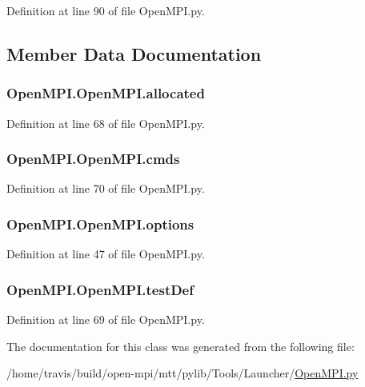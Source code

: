 Definition at line 90 of file Open\-M\-P\-I.\-py.



\subsection{Member Data Documentation}
\hypertarget{classOpenMPI_1_1OpenMPI_a9ffab4795264fde34d136269026204db}{
\subsubsection[{allocated}]{\setlength{\rightskip}{0pt plus 5cm}Open\-M\-P\-I.\-Open\-M\-P\-I.\-allocated}}\label{classOpenMPI_1_1OpenMPI_a9ffab4795264fde34d136269026204db}


Definition at line 68 of file Open\-M\-P\-I.\-py.

\hypertarget{classOpenMPI_1_1OpenMPI_a86be93bbc775c81263813274a8564efc}{
\subsubsection[{cmds}]{\setlength{\rightskip}{0pt plus 5cm}Open\-M\-P\-I.\-Open\-M\-P\-I.\-cmds}}\label{classOpenMPI_1_1OpenMPI_a86be93bbc775c81263813274a8564efc}


Definition at line 70 of file Open\-M\-P\-I.\-py.

\hypertarget{classOpenMPI_1_1OpenMPI_a4a263774614f0b83a63a26639b46b2f5}{
\subsubsection[{options}]{\setlength{\rightskip}{0pt plus 5cm}Open\-M\-P\-I.\-Open\-M\-P\-I.\-options}}\label{classOpenMPI_1_1OpenMPI_a4a263774614f0b83a63a26639b46b2f5}


Definition at line 47 of file Open\-M\-P\-I.\-py.

\hypertarget{classOpenMPI_1_1OpenMPI_acd20b78013350c2363484589ef85b67c}{
\subsubsection[{test\-Def}]{\setlength{\rightskip}{0pt plus 5cm}Open\-M\-P\-I.\-Open\-M\-P\-I.\-test\-Def}}\label{classOpenMPI_1_1OpenMPI_acd20b78013350c2363484589ef85b67c}


Definition at line 69 of file Open\-M\-P\-I.\-py.



The documentation for this class was generated from the following file\-:\begin{DoxyCompactItemize}
\item 
/home/travis/build/open-\/mpi/mtt/pylib/\-Tools/\-Launcher/\hyperlink{OpenMPI_8py}{Open\-M\-P\-I.\-py}\end{DoxyCompactItemize}
